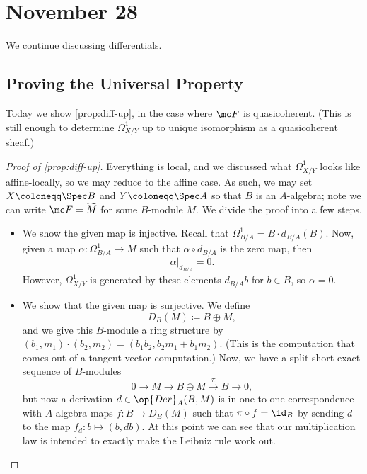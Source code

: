 \documentclass[../notes.tex]{subfiles}
\begin{document}
\section{November 28}

We continue discussing differentials.

\subsection{Proving the Universal Property}
Today we show \autoref{prop:diff-up}, in the case where $\mc F$ is quasicoherent. (This is still enough to determine $\Omega^1_{X/Y}$ up to unique isomorphism as a quasicoherent sheaf.)
\begin{proof}[{Proof of \autoref{prop:diff-up}}]
	Everything is local, and we discussed what $\Omega^1_{X/Y}$ looks like affine-locally, so we may reduce to the affine case. As such, we may set $X\coloneqq\Spec B$ and $Y\coloneqq\Spec A$ so that $B$ is an $A$-algebra; note we can write $\mc F=\widetilde M$ for some $B$-module $M$. We divide the proof into a few steps.
	\begin{itemize}
		\item We show the given map is injective. Recall that $\Omega^1_{B/A}=B\cdot d_{B/A}(B)$. Now, given a map $\alpha\colon\Omega^1_{B/A}\to M$ such that $\alpha\circ d_{B/A}$ is the zero map, then
		\[\alpha|_{d_{B/A}}=0.\]
		However, $\Omega^1_{X/Y}$ is generated by these elements $d_{B/A}b$ for $b\in B$, so $\alpha=0$.
		\item We show that the given map is surjective. We define
		\[D_B(M)\coloneqq B\oplus M,\]
		and we give this $B$-module a ring structure by $(b_1,m_1)\cdot(b_2,m_2)=(b_1b_2,b_2m_1+b_1m_2)$. (This is the computation that comes out of a tangent vector computation.) Now, we have a split short exact sequence of $B$-modules
		\[0\to M\to B\oplus M\stackrel\pi\to B\to0,\]
		but now a derivation $d\in\op{Der}_A(B,M)$ is in one-to-one correspondence with $A$-algebra maps $f\colon B\to D_B(M)$ such that $\pi\circ f=\id_B$ by sending $d$ to the map $f_d\colon b\mapsto(b,db)$. At this point we can see that our multiplication law is intended to exactly make the Leibniz rule work out.


\end{itemize}
\end{proof}
\end{document}
